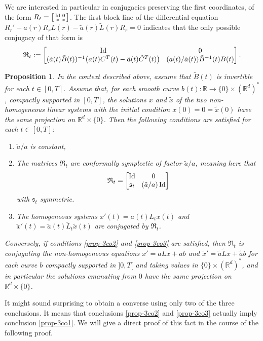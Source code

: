 \documentclass[JEP,XML,SOM,Unicode,published]{cedram}
\newenvironment{smallbmatrix}{\big[\begin{smallmatrix}}{\end{smallmatrix}\big]}
\DeclareMathOperator{\Id}{Id}
\newcommand{\Rm}{\mathbb{R}}
\newcommand{\gs}{\ensuremath{\mathfrak{s}}}
\newcommand{\gR}{\ensuremath{\mathfrak{R}}}
\theoremstyle{plain}
\newtheorem{prop}[lem]{Proposition}
\theoremstyle{definition}
\begin{document}
We are interested in particular in conjugacies preserving the first coordinates, \ie of the form
$R_t = \begin{smallbmatrix} \Id&0\\ * &* \end{smallbmatrix}$. The first block line of the differential equation
$
R_{r}' +a(r)R_{r}L(r)-\tilde a(r)\tilde L(r)R_{r}=0
$
indicates that the only possible conjugacy of that form is
\[\arraycolsep4.5pt
\gR_{t}:=
\begin{bmatrix}
\Id&0\\
(\tilde a(t)\tilde B(t))^{-1}\big( a(t)C^T(t)-\tilde a(t) \tilde C^T(t)\big) & (a(t)/\tilde a(t)) \tilde B^{-1}(t) B(t)
\end{bmatrix}.
\]

\begin{prop}\label{prop-3co}
In the context described above, assume that $\tilde B(t)$ is invertible for each $t\in [0,T]$.
Assume that, for each smooth curve $b(t):\Rm \to \{0\}\times (\Rm^d)^*$, compactly supported in $[0,T]$, the solutions
$x$ and $\tilde x$ of the two non-homogeneous linear systems with the initial condition $x(0)=0=\tilde x(0)$ have the same projection on $\Rm^d\times \{0\}$.
Then the following conditions are satisfied for each $t\in [0,T]$:
\begin{enumerate}
\item\label{prop-3co1} $\tilde a/a$ is constant,
\item\label{prop-3co2} The matrices $\gR_t$ are conformally symplectic of factor $\tilde a/a$, meaning here that
\[\arraycolsep4.5pt
\gR_t=\begin{bmatrix}
\Id&0\\ \gs_t &(\tilde a /a) \Id
\end{bmatrix}\]
with $\gs_t$ symmetric.
\item\label{prop-3co3} The homogeneous systems $x'(t)=a(t)L_tx(t)$ and $\tilde x'(t)=\tilde a(t)\tilde L_t\tilde x(t)$ are conjugated by $\gR_t$.
\end{enumerate}
Conversely, if conditions \eqref{prop-3co2} and \eqref{prop-3co3} are satisfied, then $\gR_t$ is conjugating the non-homogeneous equations $x'= aLx+ab$ and $\tilde x'=\tilde a \tilde L x+\tilde a b$ for each curve $b$ compactly supported in $]0,T[$ and taking
values in $\{0\}\times (\Rm^d)^*$, and in particular the solutions emanating from $0$ have the same projection on $\Rm^d\times \{0\}$.
\end{prop}

It might sound surprising to obtain a converse using only two of the three conclusions. It means that conclusions \eqref{prop-3co2} and \eqref{prop-3co3} actually imply conclusion \eqref{prop-3co1}. We will give a direct proof of this fact in the course of the following proof.
\end{document}

